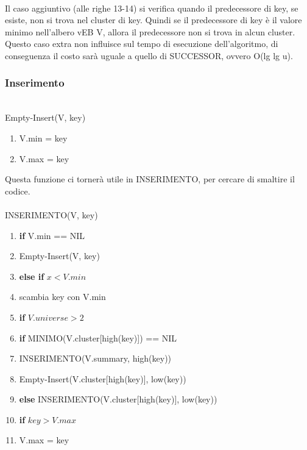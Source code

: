 \documentclass{article}
\begin{document}
\begin{flushleft}
            ~\\Il caso aggiuntivo (alle righe 13-14) si verifica quando il predecessore di key, se esiste, non si trova nel cluster di key. Quindi se il predecessore di key è il valore minimo nell'albero vEB V, allora il predecessore non si trova in alcun cluster.\\
            Questo caso extra non influisce sul tempo di esecuzione dell'algoritmo, di conseguenza il costo sarà uguale a quello di SUCCESSOR, ovvero O(lg lg u).\\
\end{flushleft}        

\begin{flushleft}            
        \subsubsection{Inserimento}
            ~\\Empty-Insert(V, key)
            \begin{enumerate}
                \item V.min = key
                \item V.max = key
            \end{enumerate}
            Questa funzione ci tornerà utile in INSERIMENTO, per cercare di smaltire il codice.\\
        
            ~\\INSERIMENTO(V, key)
            \begin{enumerate}
                \item \textbf{if} V.min == NIL
                \item \hspace{20pt} Empty-Insert(V, key)
                \item \textbf{else if} $x < V.min$
                \item \hspace{20pt} scambia key con V.min
                \item \hspace{20pt} \textbf{if} $V.universe > 2$
                \item \hspace{40pt} \textbf{if} MINIMO(V.cluster[high(key)]) == NIL
                \item \hspace{60pt} INSERIMENTO(V.summary, high(key))
                \item \hspace{60pt} Empty-Insert(V.cluster[high(key)], low(key))
                \item \hspace{40pt} \textbf{else} INSERIMENTO(V.cluster[high(key)], low(key))
                \item \hspace{20pt} \textbf{if} $key > V.max$
                \item \hspace{40pt} V.max = key
            \end{enumerate}
                

\end{flushleft}
\end{document}
